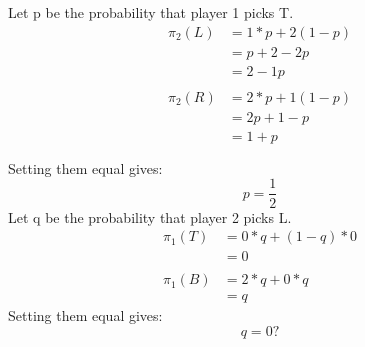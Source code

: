 \documentclass{article}
\begin{document}
Let p be the probability that player 1 picks T.
\begin{align*}
\pi_2(L) &= 1*p + 2(1-p) \\
&= p + 2 - 2p \\
&= 2 - 1p \\\\
\pi_2(R) &= 2*p + 1(1-p) \\
&= 2p + 1 -p \\
&= 1 + p \\\\
\end{align*}
Setting them equal gives:
\[ p = \frac{1}{2} \]
Let q be the probability that player 2 picks L.
\begin{align*}
\pi_1(T) &= 0*q + (1-q)*0 \\
&= 0 \\\\
\pi_1(B) &= 2*q + 0*q \\
&= q
\end{align*}
Setting them equal gives:
\[ q = 0? \]
\end{document}
